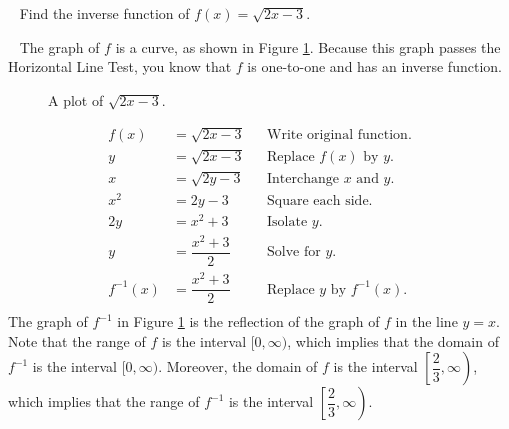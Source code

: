 \begin{example} \cite{ci}~\newline
    Find the inverse function of $f(x)=\sqrt{2x-3}.$\\
    \begin{solution}~\newline
        The graph of $f$ is a curve, as shown in Figure \ref{plot:sqrt2x-3}. Because this graph passes the Horizontal Line Test, you know that $f$ is one-to-one and has an inverse function.
        \begin{figure}[H]
            \centering
            \caption{A plot of $\sqrt{2x-3}$.}
            \label{plot:sqrt2x-3}
        \end{figure}
        \begin{align*}
            f(x)&=\sqrt{2x-3}&&\text{Write original function.}\\
            y&=\sqrt{2x-3}&&\text{Replace $f(x)$ by $y$.}\\
            x&=\sqrt{2y-3}&&\text{Interchange $x$ and $y$.}\\
            x^2&=2y-3&&\text{Square each side.}\\
            2y&=x^2+3&&\text{Isolate $y$.}\\
            y&=\dfrac{x^2+3}{2}&&\text{Solve for $y$.}\\
            f^{-1}(x)&=\dfrac{x^2+3}{2}&&\text{Replace $y$ by $f^{-1}(x)$.}\\
        \end{align*}
        The graph of $f^{-1}$ in Figure \ref{plot:sqrt2x-3} is the reflection of the graph of $f$ in the line $y=x$. Note that the range of $f$ is the interval $[0,\infty)$, which implies that the domain of $f^{-1}$ is the interval $[0,\infty)$. Moreover, the domain of $f$ is the interval $\left[\dfrac{2}{3},\infty\right)$, which implies that the range of $f^{-1}$ is the interval $\left[\dfrac{2}{3},\infty\right)$.
	\end{solution}
\end{example}

